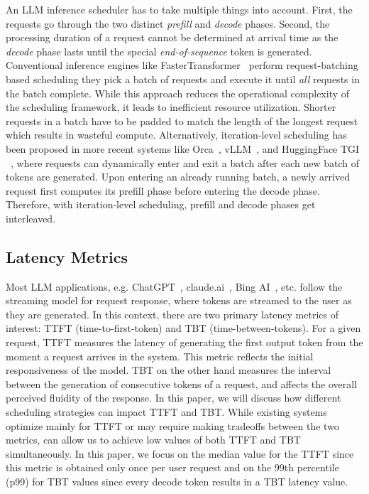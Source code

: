  An LLM inference scheduler has to take multiple things into account. First, the requests go through the two distinct \textit{prefill} and \textit{decode} phases. Second, the processing duration of a request cannot be determined at arrival time as the \textit{decode} phase lasts until the special \textit{end-of-sequence} token is generated. Conventional inference engines like FasterTransformer~\cite{fastertransformer} perform request-batching based scheduling \ie they pick a batch of requests and execute it until \textit{all} requests in the batch complete. While this approach reduces the operational complexity of the scheduling framework, it leads to inefficient resource utilization. Shorter requests in a batch have to be padded to match the length of the longest request which results in wasteful compute. Alternatively, iteration-level scheduling has been proposed in more recent systems like Orca~\cite{orca}, vLLM~\cite{vLLM:github}, and HuggingFace TGI ~\cite{hftgi}, where requests can dynamically enter and exit a batch after each new batch of tokens are generated. Upon entering an already running batch, a newly arrived request first computes its prefill phase before entering the decode phase. Therefore, with iteration-level scheduling, prefill and decode phases get interleaved.%














\subsection{Latency Metrics}
\label{subsec:latency_metrics}
Most LLM applications, e.g. ChatGPT~\cite{chatgpt}, claude.ai~\cite{claudeai}, Bing AI~\cite{bingai}, etc. follow the streaming model for request response, where tokens are streamed to the user as they are generated. In this context, there are two primary latency metrics of interest: TTFT (time-to-first-token) and TBT (time-between-tokens). For a given request, TTFT measures the latency of generating the first output token from the moment a request arrives in the system. This metric reflects the initial responsiveness of the model. TBT on the other hand measures the interval between the generation of consecutive tokens of a request, and affects the overall perceived fluidity of the response. In this paper, we will discuss how different scheduling strategies can impact TTFT and TBT. While existing systems~\cite{orca,vllmsosp,hftgi} optimize mainly for TTFT or may require making tradeoffs between the two metrics, \sysname can allow us to achieve low values of both TTFT and TBT simultaneously. In this paper, we focus on the median value for the TTFT since this metric is obtained only once per user request and on the 99th percentile (p99) for TBT values since every decode token results in a TBT latency value.

